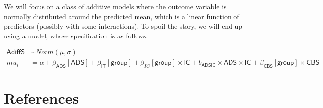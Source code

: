 \documentclass[10pt,dvipsnames,enabledeprecatedfontcommands]{scrartcl}
\begin{document}
We will focus on a class of additive models where the outcome variable
is normally distributed around the predicted mean, which is a linear
function of predictors (possibly with some interactions). To spoil the
story, we will end up using a model, whose specification is as follows:

\begin{align*}
\mathsf{AdiffS} & \sim Norm(\mu, \sigma)\\
mu_i & = \alpha + \beta_{\mathsf{ADS}}[\mathsf{ADS}] + \beta_{\mathsf{IT}}[\mathsf{group}] +
 \beta_{IC}[\mathsf{group}]\times \mathsf{IC} + b_{\mathsf{ADSIC}}\times \mathsf{ADS} \times \mathsf{IC} + \beta_{\mathsf{CBS}}[\mathsf{group}] \times \mathsf{CBS}
\end{align*}

\section*{References}\label{references}

\vspace{-3mm}
\end{document}
